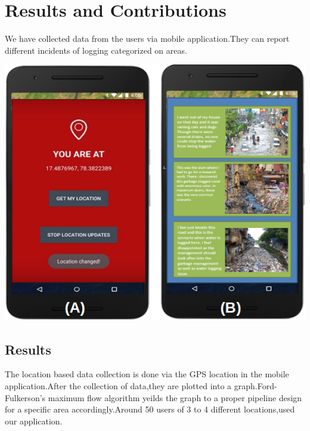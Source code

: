 \documentclass{acm_proc_article-sp}
\begin{document}
\section{Results and Contributions}

We have collected data from the users via mobile application.They can report different incidents of logging categorized on areas.

\begin{center}\vspace{0.2cm}
\includegraphics[width=1.0\linewidth]{app.png}
\end{center}\vspace{0.2cm}
 

\subsection{Results}

The location based data collection is done via the GPS location in the mobile application.After the collection of data,they are plotted into a graph.Ford-Fulkerson's maximum flow algorithm yeilds the graph to a proper pipeline design for a specific area accordingly.Around 50 users of 3 to 4 different locations,used our application.
\end{document}
